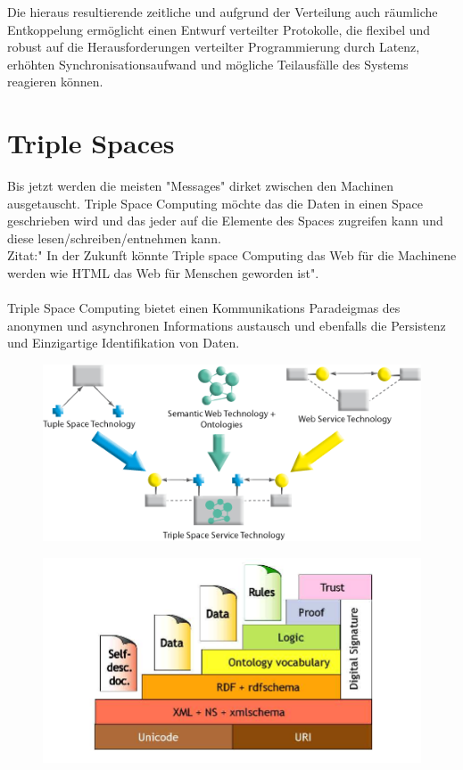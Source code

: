 \documentclass[a4paper,12pt]{scrreprt}
\begin{document}
		Die hieraus resultierende zeitliche und aufgrund der Verteilung auch räumliche Entkoppelung ermöglicht einen Entwurf verteilter Protokolle, die flexibel und robust auf die Herausforderungen verteilter Programmierung durch Latenz, erhöhten Synchronisationsaufwand und mögliche Teilausfälle des Systems reagieren können. %
		
		
		\section{Triple Spaces}
		
		Bis jetzt werden die meisten "Messages" dirket zwischen den Machinen ausgetauscht. Triple Space Computing möchte das die Daten in einen
		Space geschrieben wird und das jeder auf die Elemente des Spaces zugreifen kann und diese lesen/schreiben/entnehmen kann.\\
		Zitat:" In der Zukunft könnte Triple space Computing das Web für die Machinene werden wie HTML das Web für Menschen geworden ist".\\ \\
		Triple Space Computing bietet einen Kommunikations Paradeigmas des anonymen und asynchronen Informations austausch und ebenfalls die 
		Persistenz und Einzigartige Identifikation von Daten.\\
			
		

\begin{figure}[h]
\centering
\includegraphics[width=0.7\linewidth]{./tripcom_overview2}
\caption{}
\label{fig:tripcom_overview2}
\end{figure}
\begin{figure}[h]
\centering
\includegraphics[width=0.7\linewidth]{./Semantic_Web_www_tripcom_org_docs_coordination07_paper}
\caption{}
\label{fig:Semantic_Web_www_tripcom_org_docs_coordination07_paper}
\end{figure}
		
\end{document}
